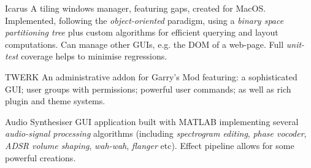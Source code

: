 
\begin{cvopensource}

  \cvproject
    {Icarus} %
    {
      A tiling windows manager, featuring gaps, created for MacOS. Implemented, following the \textit{object-oriented} paradigm, using a \textit{binary space partitioning tree} plus custom algorithms for efficient querying and layout computations. Can manage other GUIs, e.g. the DOM of a web-page. Full \textit{unit-test} coverage helps to minimise regressions.
    }

  \cvproject
    {TWERK} %
    {
      An administrative addon for Garry's Mod featuring: a sophisticated GUI; user groups with permissions; powerful user commands; as well as rich plugin and theme systems.
    }

  \cvproject
    {Audio Synthesiser} %
    {
      GUI application built with MATLAB implementing several \textit{audio-signal processing} algorithms (including \textit{spectrogram editing}, \textit{phase vocoder}, \textit{ADSR volume shaping}, \textit{wah-wah}, \textit{flanger} etc). Effect pipeline allows for some powerful creations.
    }
\end{cvopensource}
